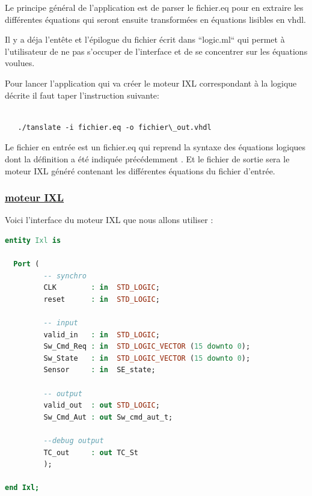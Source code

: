 \medskip

Le principe général de l'application est de parser le fichier.eq pour
en extraire les différentes équations qui seront ensuite transformées en
équations lisibles en vhdl.

\medskip

Il y a déja l'entête et l'épilogue du fichier écrit dans ``logic.ml`` qui
permet à l'utilisateur de ne pas s'occuper de l'interface et de se
concentrer sur les équations voulues.

\medskip

Pour lancer l'application qui va créer le moteur IXL correspondant à la logique décrite il faut taper l'instruction suivante:

\begin{lstlisting}

   ./tanslate -i fichier.eq -o fichier\_out.vhdl

\end{lstlisting}




Le fichier en entrée est un fichier.eq qui reprend la syntaxe des
équations logiques dont la définition a été indiquée précédemment  \cite{}.
Et le fichier de sortie sera le moteur IXL généré contenant les
différentes équations du fichier d'entrée.

\newpage

\subsubsection{\underline{moteur IXL}}
\label{sec:IXL}

Voici l'interface du moteur IXL que nous allons utiliser :

\begin{lstlisting}[language=vhdl]
entity Ixl is  

  Port (
         -- synchro   
         CLK        : in  STD_LOGIC;
         reset      : in  STD_LOGIC;

         -- input
         valid_in   : in  STD_LOGIC; 
         Sw_Cmd_Req : in  STD_LOGIC_VECTOR (15 downto 0);
         Sw_State   : in  STD_LOGIC_VECTOR (15 downto 0);
         Sensor     : in  SE_state;
         
         -- output
         valid_out  : out STD_LOGIC;
         Sw_Cmd_Aut : out Sw_cmd_aut_t;

         --debug output
         TC_out     : out TC_St
         );

end Ixl;

\end{lstlisting}

